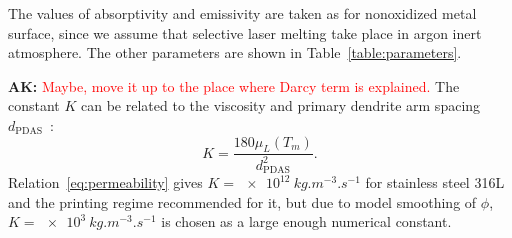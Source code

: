\documentclass[final]{elsarticle} %
\newcommand{\ak}[1] {\textbf{AK:} \textcolor{red}{#1}}
\begin{document}
The values of absorptivity and emissivity are taken as for nonoxidized metal surface, since we assume that selective laser melting take place in argon inert atmosphere. The other parameters are shown in Table~\ref{table:parameters}.

\ak{Maybe, move it up to the place where Darcy term is explained.}
The constant $K$ can be related to the viscosity and primary dendrite arm spacing $d_\text{PDAS}$~\cite{kubo1985mathematical}:
\begin{equation}\label{eq:permeability}
    K = \frac{180\mu_{L}(T_m)}{d_\text{PDAS}^2}.
\end{equation}
Relation~\eqref{eq:permeability} gives $K = \SI{e12}{kg.m^{-3}.s^{-1}}$
for stainless steel 316L and the printing regime recommended for it,
but due to model smoothing of $\phi$,
$K = \SI{e3}{kg.m^{-3}.s^{-1}}$ is chosen as a large enough numerical constant.
\end{document}
